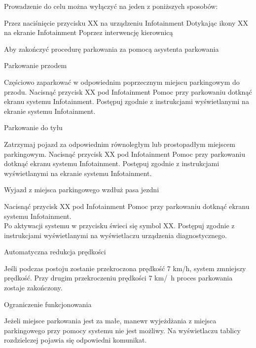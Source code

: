Prowadzenie do celu można wyłączyć na jeden z poniższych sposobów:

\begin{itemizeTriangle}
	\itemTriangle Przez naciśnięcie przycisku XX na urządzeniu Infotainment
	\itemTriangle Dotykając ikony XX na ekranie Infotainment
	\itemTriangle Poprzez interwencję kierownicą
\end{itemizeTriangle}

Aby zakończyć procedurę parkowania za pomocą asystenta parkowania

Parkowanie przodem

\begin{itemizeArrow}
	\itemArrow Częściowo zaparkować w odpowiednim poprzecznym miejscu parkingowym do przodu.
	\itemArrow Nacisnąć przycisk XX pod Infotainment Pomoc przy parkowaniu dotknąć ekranu systemu Infotainment.
	\itemArrow Postępuj zgodnie z instrukcjami wyświetlanymi na ekranie systemu Infotainment.
\end{itemizeArrow}

Parkowanie do tyłu

\begin{itemizeArrow}
	\itemArrow Zatrzymaj pojazd za odpowiednim równoległym lub prostopadłym miejscem parkingowym.
	\itemArrow Nacisnąć przycisk XX pod Infotainment Pomoc przy parkowaniu dotknąć ekranu systemu Infotainment.
	\itemArrow Postępuj zgodnie z instrukcjami wyświetlanymi na ekranie systemu Infotainment.
\end{itemizeArrow}

Wyjazd z miejsca parkingowego wzdłuż pasa jezdni

\begin{itemizeArrow}
	\itemArrow Nacisnąć przycisk XX pod Infotainment Pomoc przy parkowaniu dotknąć ekranu systemu Infotainment. \\ Po aktywacji systemu w przycisku świeci się symbol XX.
	\itemArrow Postępuj zgodnie z instrukcjami wyświetlanymi na wyświetlaczu urządzenia diagnostycznego.
\end{itemizeArrow}

Automatyczna redukcja prędkości

Jeśli podczas postoju zostanie przekroczona prędkość 7 km/h, system zmniejszy prędkość.
Przy drugim przekroczeniu prędkości 7 km/\ h proces parkowania zostaje zakończony.

Ograniczenie funkcjonowania

Jeżeli miejsce parkowania jest za małe, manewr wyjeżdżania z miejsca parkingowego przy pomocy systemu nie jest możliwy. Na wyświetlaczu tablicy rozdzielczej pojawia się odpowiedni komunikat.


